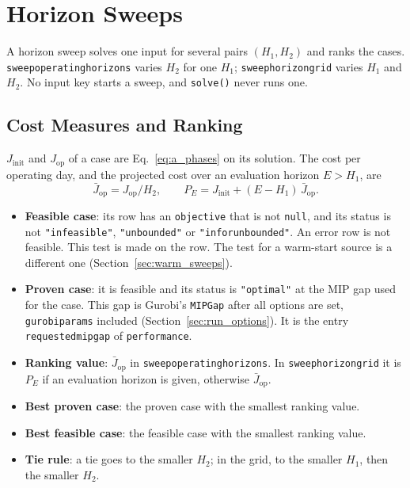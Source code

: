 \documentclass[11pt,a4paper]{article}
\theoremstyle{plain}
\theoremstyle{definition}
\renewcommand{\_}{\textunderscore\allowbreak{}}
\begin{document}
\section{Horizon Sweeps}
\label{sec:sweeps}

A horizon sweep solves one input for several pairs $(H_1, H_2)$ and ranks the cases. \texttt{sweep\_operating\_horizons} varies $H_2$ for one $H_1$; \texttt{sweep\_horizon\_grid} varies $H_1$ and $H_2$.
No input key starts a sweep, and \texttt{solve()} never runs one.

\subsection{Cost Measures and Ranking}
\label{sec:sweep_criteria}

$J_{\mathrm{init}}$ and $J_{\mathrm{op}}$ of a case are Eq.~\eqref{eq:a_phases} on its solution. The cost per operating day, and the projected cost over an evaluation horizon $E > H_1$, are
\begin{equation}
  \bar J_{\mathrm{op}} = J_{\mathrm{op}} / H_2, \qquad
  P_E = J_{\mathrm{init}} + (E - H_1)\,\bar J_{\mathrm{op}} .
  \label{eq:d_projected}
\end{equation}
\begin{itemize}[nosep,leftmargin=1.5em]
  \item \textbf{Feasible case}: its row has an \texttt{objective} that is not \texttt{null}, and its status is not \texttt{"infeasible"}, \texttt{"unbounded"} or \texttt{"inf\_or\_unbounded"}. An error row is not feasible. This test is made on the row. The test for a warm-start source is a different one (Section~\ref{sec:warm_sweeps}).
  \item \textbf{Proven case}: it is feasible and its status is \texttt{"optimal"} at the MIP gap used for the case. This gap is Gurobi's \texttt{MIPGap} after all options are set, \texttt{gurobi\_params} included (Section~\ref{sec:run_options}). It is the entry \texttt{requested\_mip\_gap} of \texttt{performance}.
  \item \textbf{Ranking value}: $\bar J_{\mathrm{op}}$ in \texttt{sweep\_operating\_horizons}. In \texttt{sweep\_horizon\_grid} it is $P_E$ if an evaluation horizon is given, otherwise $\bar J_{\mathrm{op}}$.
  \item \textbf{Best proven case}: the proven case with the smallest ranking value.
  \item \textbf{Best feasible case}: the feasible case with the smallest ranking value.
  \item \textbf{Tie rule}: a tie goes to the smaller $H_2$; in the grid, to the smaller $H_1$, then the smaller $H_2$.
\end{itemize}
\end{document}
